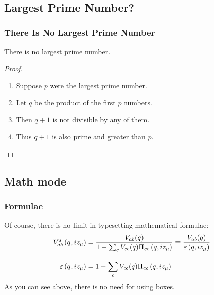 \documentclass[aspectratio=169]{beamer}
\begin{document}
\subsection{Largest Prime Number?}
\begin{frame}[mpidrbackground=2]

  \frametitle{There Is No Largest Prime Number}
  \begin{theorem}
		There is no largest prime number.
  \end{theorem}
  \begin{proof}
    \begin{enumerate}
    \item<1-| alert@1> Suppose $p$ were the largest prime number.
    \item<2-> Let $q$ be the product of the first $p$ numbers.
    \item<3-> Then $q+1$ is not divisible by any of them.
    \item<1-> Thus $q+1$ is also prime and greater than $p$.\qedhere
    \end{enumerate}
  \end{proof}
\end{frame}


\subsection{Math mode}
\begin{frame}[mpidrbackground=2]
    \frametitle{Formulae}
	Of course, there is no limit in typesetting mathematical formulae:
	\begin{align}
		V_{ab}^s\left(q, i z_\mu\right)
			&= \frac{V_{ab}(q)}{1-\sum_{c}V_{cc}(q)\Pi_{cc}\left(q, i z_\mu\right)} 
				\equiv \frac{V_{ab}(q)}{\varepsilon\left(q, i z_\mu\right)}  \\
		\rule{0pt}{2em}\varepsilon\left(q, iz_\mu\right) 
			&= 1-\sum_c V_{cc}(q)\Pi_{cc}\left(q, i z_\mu\right)
	\end{align}
	As you can see above, there is no need for using boxes.
\end{frame}
\end{document}
